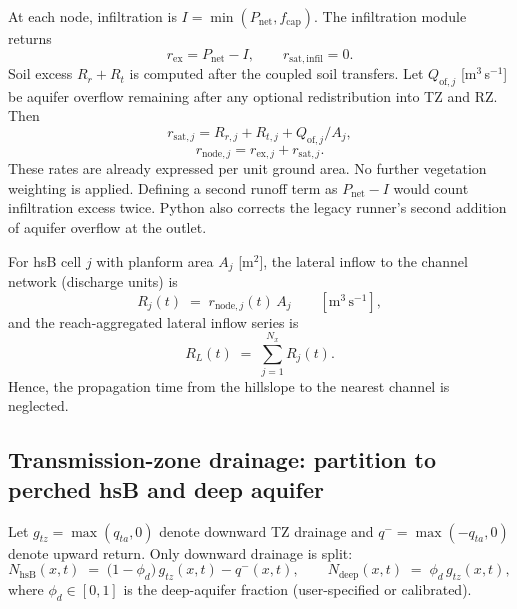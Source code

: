 \documentclass[12pt]{article}
\begin{document}
At each node, infiltration is $I=\min(P_{\mathrm{net}},f_{\mathrm{cap}})$. The infiltration module returns
\begin{equation}
r_{\mathrm{ex}}=P_{\mathrm{net}}-I,\qquad r_{\mathrm{sat,infil}}=0.
\label{eq:rex}
\end{equation}
Soil excess $R_r+R_t$ is computed after the coupled soil transfers. Let $Q_{\mathrm{of},j}$ [m$^3$\,s$^{-1}$] be aquifer overflow remaining after any optional redistribution into TZ and RZ. Then
\begin{equation}
r_{\mathrm{sat},j}=R_{r,j}+R_{t,j}+Q_{\mathrm{of},j}/A_j,
\label{eq:rsat}
\end{equation}
\begin{equation}
r_{\mathrm{node},j}=r_{\mathrm{ex},j}+r_{\mathrm{sat},j}.
\label{eq:r-total}
\end{equation}
These rates are already expressed per unit ground area. No further vegetation weighting is applied. Defining a second runoff term as $P_{\mathrm{net}}-I$ would count infiltration excess twice. Python also corrects the legacy runner's second addition of aquifer overflow at the outlet.

For hsB cell $j$ with planform area $A_j$ [m$^2$], the lateral inflow to the channel network (discharge units) is
\begin{equation}
R_j(t) \;=\; r_{\text{node},j}(t)\, A_j \qquad [\mathrm{m^3\,s^{-1}}],
\label{eq:Rj}
\end{equation}
and the reach-aggregated lateral inflow series is
\begin{equation}
R_L(t) \;=\; \sum_{j=1}^{N_x} R_j(t).
\label{eq:RL}
\end{equation}
Hence, the propagation time from the hillslope to the nearest channel is neglected.

\subsection{Transmission-zone drainage: partition to perched hsB and deep aquifer}

Let $g_{tz}=\max(q_{ta},0)$ denote downward TZ drainage and $q^-=\max(-q_{ta},0)$ denote upward return. Only downward drainage is split:
\begin{equation}
N_{\text{hsB}}(x,t) \;=\; \bigl(1-\phi_d\bigr)\, g_{tz}(x,t)-q^-(x,t),
\qquad
N_{\text{deep}}(x,t) \;=\; \phi_d\, g_{tz}(x,t),
\label{eq:split}
\end{equation}
where $\phi_d\in[0,1]$ is the deep-aquifer fraction (user-specified or calibrated).
\end{document}

